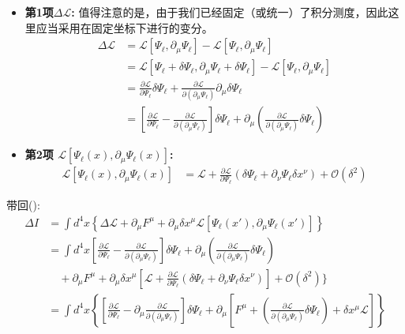 \begin{itemize}
  \item \textbf{第1项\(\Delta\mathscr{L}\):}
值得注意的是，由于我们已经固定（或统一）了积分测度，因此这里应当采用在固定坐标下进行的变分。
    \begin{align*}
      \Delta \mathscr{L} &= \mathscr{L}[\Psi_\ell , \partial_\mu \Psi_\ell ] - \mathscr{L}[\Psi_\ell, \partial_\mu \Psi_\ell] \\
        &= \mathscr{L}[\Psi_\ell+\delta\Psi_\ell, \partial_\mu \Psi_\ell+\delta\Psi_\ell] - \mathscr{L}[\Psi_\ell, \partial_\mu \Psi_\ell] \\
        &=\frac{\partial\mathscr{L}}{\partial \Psi_\ell}\delta\Psi_\ell+\frac{\partial \mathscr{L}}{\partial (\partial_\mu \Psi_\ell)}\partial_\mu\delta\Psi_\ell\\
        &=\left[\frac{\partial\mathscr{L}}{\partial \Psi_\ell}-\frac{\partial \mathscr{L}}{\partial (\partial_\mu \Psi_\ell)} \right]\delta\Psi_\ell+\partial_\mu\left(\frac{\partial \mathscr{L}}{\partial (\partial_\mu \Psi_\ell)}\delta\Psi_\ell\right)
    \end{align*}
  \item \textbf{第2项 \(\mathscr{L}[\Psi_\ell (x), \partial_\mu \Psi_\ell (x)]\):}
    \begin{align*}
      \mathscr{L}[\Psi_\ell (x), \partial_\mu \Psi_\ell (x)] 
      &= \mathscr{L} + \frac{\partial \mathscr{L}}{\partial \Psi_\ell} \left( \delta \Psi_\ell + \partial_\nu \Psi_\ell \delta x^\nu \right) + \mathscr{O}(\delta^2)
    \end{align*}
\end{itemize}
带回():
\begin{equation*}
  \begin{aligned}
\Delta I &= \int d^4 x \left\{ 
\Delta \mathscr{L} + \partial_\mu F^\mu 
+ \partial_\mu \delta x^\mu 
\mathscr{L}[\Psi_\ell (x'), \partial_\mu \Psi_\ell (x')] 
\right\} \\
&= \int d^4 x \left[\frac{\partial\mathscr{L}}{\partial \Psi_\ell}-\frac{\partial \mathscr{L}}{\partial (\partial_\mu \Psi_\ell)} \right]\delta\Psi_\ell+\partial_\mu\left(\frac{\partial \mathscr{L}}{\partial (\partial_\mu \Psi_\ell)}\delta\Psi_\ell\right)\\
&\quad + \partial_\mu F^\mu 
+ \partial_\mu \delta x^\mu \left[ \mathscr{L} + \frac{\partial \mathscr{L}}{\partial \Psi_\ell} \left( \delta \Psi_\ell 
+ \partial_\nu \Psi_\ell \delta x^\nu \right) \right] 
+ \mathscr{O}(\delta^2)
\Big\} \\
&= \int d^4 x \left\{ 
\left[ \frac{\partial \mathscr{L}}{\partial \Psi_\ell} 
- \partial_\mu \frac{\partial \mathscr{L}}{\partial (\partial_\mu \Psi_\ell)} \right] \delta \Psi_\ell
+ \partial_\mu \left[ F^\mu +\left(\frac{\partial \mathscr{L}}{\partial (\partial_\mu \Psi_\ell)}\delta\Psi_\ell\right)
+ \delta x^\mu \mathscr{L} \right] 
\right\}
\end{aligned}
\end{equation*}
